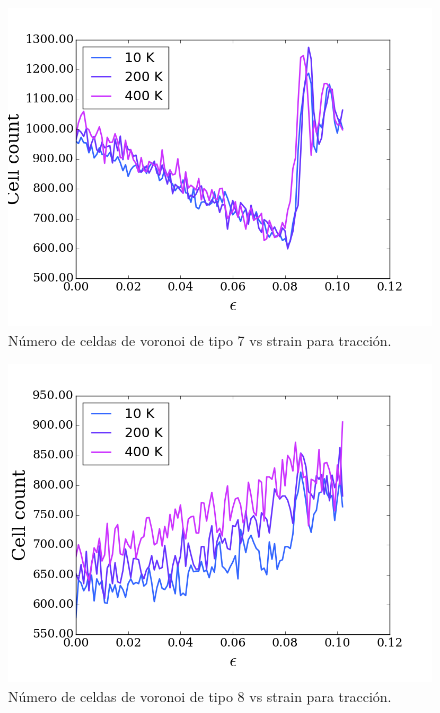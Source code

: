 \documentclass[10pt, oneside]{article} %
\begin{document}
\begin{figure}[H]
\centering
\includegraphics[width=15cm]{Figures/NanoParticles/voro_type7_tension.png}
\caption{Número de celdas de voronoi de tipo 7 vs strain para tracción.}
\end{figure}

\begin{figure}[H]
\centering
\includegraphics[width=15cm]{Figures/NanoParticles/voro_type8_tension.png}
\caption{Número de celdas de voronoi de tipo 8 vs strain para tracción.}
\end{figure}
\end{document}
